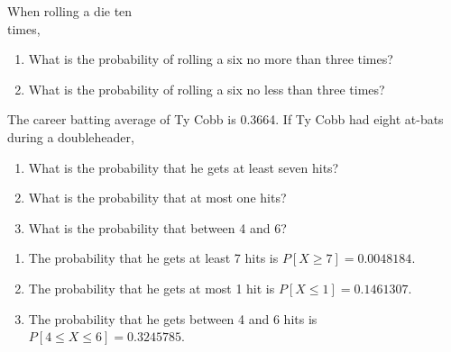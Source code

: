 \documentclass[11pt]{book}\usepackage[]{graphicx}\usepackage[]{color}
\begin{document}
\begin{exercises}
  \begin{exercise} %

When rolling a die ten \\ times,

\begin{enumerate}
\item What is the probability of rolling a six no more than three times?
\item What is the probability of rolling a six no less  than three times?
\end{enumerate}
	\end{exercise}
%
%

  \begin{exercise} %

The career batting average of Ty Cobb is 0.3664. If Ty Cobb had eight at-bats during a doubleheader,

\begin{enumerate}
\item What is the probability that he gets at least seven hits?
\item What is the probability that at most one hits?
\item What is the probability that between 4 and 6?
\end{enumerate}
	\end{exercise}
	\begin{solution}  %


\begin{enumerate}
\item The probability that he gets at least 7 hits is $P[X \ge 7] = 0.0048184$.
\item The probability that he gets at most 1 hit is $P[X \le 1] = 0.1461307$.
\item The probability that he gets between 4 and 6 hits is $P[4 \le X \le 6] = 0.3245785$.
\end{enumerate}


\end{solution}
\end{exercises}
\end{document}

